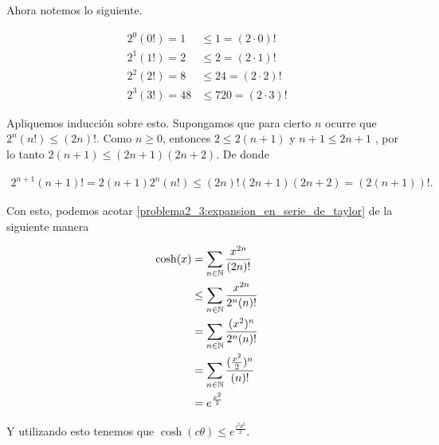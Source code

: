 Ahora notemos lo siguiente.

\begin{align}
    2^0(0!) = 1     &\leq  1     = (2 \cdot 0)!      \\
    2^1(1!) = 2     &\leq  2     = (2 \cdot 1)!      \\
    2^2(2!) = 8     &\leq  24    = (2 \cdot 2)!      \\
    2^3(3!) = 48    &\leq 720    = (2 \cdot 3)!      
\end{align}\par\null

Apliquemos inducción sobre esto. Supongamos que para cierto $n$ ocurre que $2^n(n!) \leq (2n)!$. Como $n \geq 0$, 
entonces $2 \leq 2(n + 1)$ y $n + 1\leq 2n+1$ , por lo tanto $2 (n+1) \leq (2n+1) (2n + 2)$. 
De donde 

\begin{align}
    2^{n+1}(n+1)! = 2(n+1) 2^n(n!) \leq (2n)! (2n+1)(2n+2) = (2(n+1))!.
\end{align}\par\null

Con esto, podemos acotar \eqref{problema2_3:expansion_en_serie_de_taylor} de la siguiente manera

\begin{align}
    \cosh(x)    &=      \sum_{n \in \mathbb{N}} \frac{x^{2n}}{(2n)!}            \\
                &\leq   \sum_{n \in \mathbb{N}} \frac{x^{2n}}{2^n(n)!}          \\
                &=   \sum_{n \in \mathbb{N}} \frac{(x^2)^{n}}{2^n(n)!}          \\
                &=   \sum_{n \in \mathbb{N}} \frac{(\frac{x^2}{2})^{n}}{(n)!}   \\   
                &=   e^{\frac{x^2}{2}}   
\end{align}

Y utilizando esto tenemos que $\cosh(c \theta) \leq e^{\frac{c^2 \theta^2}{2}}$.


